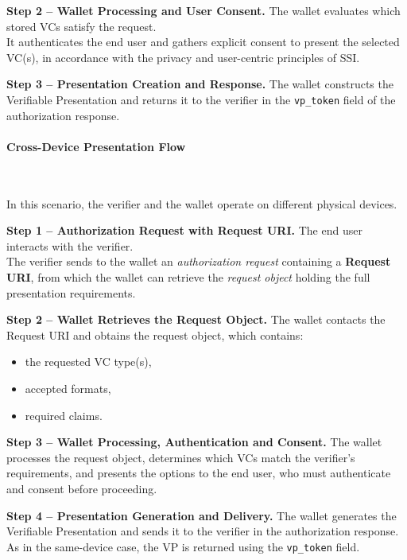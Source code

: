 \noindent
\textbf{Step 2 – Wallet Processing and User Consent.}  
The wallet evaluates which stored VCs satisfy the request.\\ 
It authenticates the end user and gathers explicit consent to present the selected VC(s), in accordance with the privacy and user-centric principles of SSI.
\bigskip

\noindent
\textbf{Step 3 – Presentation Creation and Response.}  
The wallet constructs the Verifiable Presentation and returns it to the verifier in the \texttt{vp\_token} field of the authorization response.
\vspace{1 cm}

\paragraph{Cross-Device Presentation Flow} ~

\noindent
In this scenario, the verifier and the wallet operate on different physical devices.
\medskip

\noindent
\textbf{Step 1 – Authorization Request with Request URI.}  
The end user interacts with the verifier.\\
The verifier sends to the wallet an \emph{authorization request} containing a \textbf{Request URI}, from which the wallet can retrieve the \emph{request object} holding the full presentation requirements.
\bigskip

\noindent
\textbf{Step 2 – Wallet Retrieves the Request Object.}  
The wallet contacts the Request URI and obtains the request object, which contains:
\begin{itemize}
    \item the requested VC type(s),
    \item accepted formats,
    \item required claims.
\end{itemize}
\medskip

\noindent
\textbf{Step 3 – Wallet Processing, Authentication and Consent.}  
The wallet processes the request object, determines which VCs match the verifier’s requirements, and presents the options to the end user, who must authenticate and consent before proceeding.
\bigskip

\noindent
\textbf{Step 4 – Presentation Generation and Delivery.}  
The wallet generates the Verifiable Presentation and sends it to the verifier in the authorization response. \\ 
As in the same-device case, the VP is returned using the \texttt{vp\_token} field.
